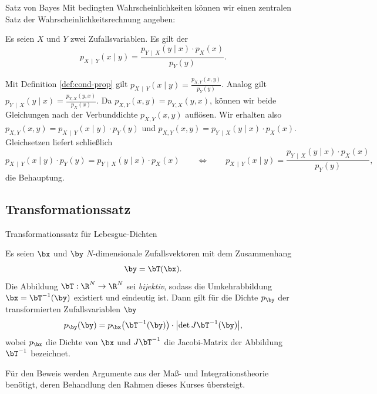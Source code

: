 \begin{frame}{Satz von Bayes}{}
	Mit bedingten Wahrscheinlichkeiten können wir einen zentralen Satz der Wahrscheinlichkeitsrechnung angeben:
	\begin{mytheo}[th:bayes]
		Es seien $X$ und $Y$ zwei Zufallsvariablen. Es gilt der 
		\begin{equation*}
			p_{X\,\mid\,Y}(x \mid y) = \frac{p_{Y\,\mid\,X}(y \mid x) \cdot p_X(x)}{p_Y(y)}.
		\end{equation*}
	\end{mytheo}

	\begin{myproof}
		Mit Definition \ref{def:cond-prop} gilt $p_{X\,\mid\,Y}(x \mid y) = \frac{p_{X, Y}(x, y)}{p_Y(y)}$.
		Analog gilt $p_{Y\,\mid\,X}(y \mid x) = \frac{p_{Y, X}(y, x)}{p_X(x)}$.
		Da $p_{X, Y}(x, y) = p_{Y, X}(y, x)$, können wir beide Gleichungen nach der Verbunddichte $p_{X, Y}(x, y)$ auflösen.
		Wir erhalten also
		$p_{X, Y}(x, y) = p_{X\,\mid\,Y}(x \mid y) \cdot p_Y(y)$ und $p_{X, Y}(x, y) = p_{Y\,\mid\,X}(y \mid x) \cdot p_X(x)$.
		Gleichsetzen liefert schließlich
		\begin{equation*}
			p_{X\,\mid\,Y}(x \mid y) \cdot p_Y(y) = p_{Y\,\mid\,X}(y \mid x) \cdot p_X(x)
		\qquad\Longleftrightarrow\qquad
			p_{X\,\mid\,Y}(x \mid y) = \frac{p_{Y\,\mid\,X}(y \mid x) \cdot p_X(x)}{p_Y(y)},
		\end{equation*}
		die Behauptung.
	\end{myproof}
\end{frame}


\subsection{Transformationssatz}

\begin{frame}{Transformationssatz für Lebesgue-Dichten}{}
	\begin{mytheo}[th:transformation]
		Es seien $\bx$ und $\by$ $N$-dimensionale Zufallsvektoren mit dem Zusammenhang
		\begin{equation*}
			\by = \bT(\bx).
		\end{equation*}
		Die Abbildung $\bT : \R^N \rightarrow \R^N$ sei \textit{bijektiv}, sodass die Umkehrabbildung $\bx = \bT^{-1}(\by)$
		existiert und eindeutig ist. Dann gilt für die Dichte $p_{\by}$ der transformierten Zufallsvariablen $\by$
		\begin{equation*}
			p_{\by}(\by) = p_{\bx}\bigl( \bT^{-1}(\by) \bigr) \cdot \bigl\vert \det J\bT^{-1}(\by) \bigr\vert,
		\end{equation*}
		wobei $p_{\bx}$ die Dichte von $\bx$ und $J \bT^{-1}$ die Jacobi-Matrix der Abbildung $\bT^{-1}$ bezeichnet.
	\end{mytheo}
	
	\begin{myproof}
		Für den Beweis werden Argumente aus der Maß- und Integrationstheorie benötigt, deren Behandlung den Rahmen dieses Kurses übersteigt.
	\end{myproof}
\end{frame}



